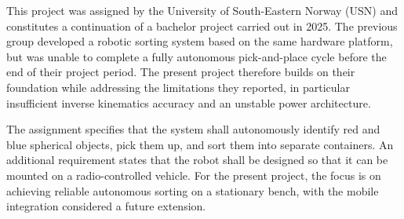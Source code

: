 
This project was assigned by the University of South-Eastern Norway (USN) and
constitutes a continuation of a bachelor project carried out in 2025. The previous
group developed a robotic sorting system based on the same hardware platform, but
was unable to complete a fully autonomous pick-and-place cycle before the end of
their project period. The present project therefore builds on their foundation
while addressing the limitations they reported, in particular insufficient inverse
kinematics accuracy and an unstable power architecture.

The assignment specifies that the system shall autonomously identify red and blue
spherical objects, pick them up, and sort them into separate containers. An
additional requirement states that the robot shall be designed so that it can be
mounted on a radio-controlled vehicle. For the present project, the focus is on
achieving reliable autonomous sorting on a stationary bench, with the mobile
integration considered a future extension.